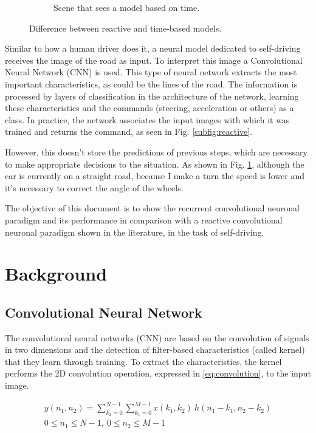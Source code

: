 \documentclass[conference]{IEEEtran}
\begin{document}
\begin{figure}[h]
\begin{subfigure}{0.22\textwidth}
		\caption{Scene that sees a model based on time.} 
		\label{subfig:recurrent}
	\end{subfigure}
	\caption{Difference between reactive and time-based models.} 
	\label{fig:comparsion}
\end{figure}

Similar to how a human driver does it, a neural model dedicated to self-driving receives the image of the road as input. To interpret this image a Convolutional Neural Network (CNN) is used. This type of neural network extracts the most important characteristics, as could be the lines of the road. The information is processed by layers of classification in the architecture of the network, learning these characteristics and the commands (steering, acceleration or others) as a class. In practice, the network associates the input images with which it was trained and returns the command, as seen in Fig. \ref{subfig:reactive}.

However, this doesn't store the predictions of previous steps, which are necessary to make appropriate decisions to the situation. As shown in Fig. \ref{subfig:recurrent}, although the car is currently on a straight road, because I make a turn the speed is lower and it's necessary to correct the angle of the wheels.

The objective of this document is to show the recurrent convolutional neuronal paradigm and its performance in comparison with a reactive convolutional neuronal paradigm shown in the literature, in the task of self-driving.


\section{Background}

\subsection{Convolutional Neural Network}

The convolutional neural networks (CNN) are based on the convolution of signals in two dimensions and the detection of filter-based characteristics (called kernel) that they learn through training. To extract the characteristics, the kernel performs the 2D convolution operation, expressed in \eqref{eq:convolution}, to the input image. 

\begin{equation}
\begin{split}
y(n_1, n_2) = \sum_{k_2=0}^{N-1} \sum_{k_1=0}^{M-1} x(k_1, k_2)\ h(n_1 - k_1, n_2 - k_2)\\
0 \leq n_1 \leq N-1,\ 0 \leq n_2 \leq M - 1
\end{split}
\label{eq:convolution}
\end{equation}
\end{document}
